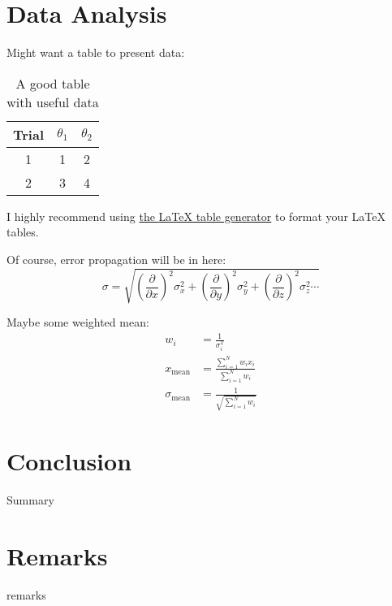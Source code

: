 \documentclass[11pt,oneside,letterpaper]{article} %
\begin{document}
\section{Data Analysis}
Might want a table to present data:


\begin{table}[H] %
\centering
\begin{tabular}{|c|c|c|}
	\hline
	Trial & $\theta_1$ & $\theta_2$  \\ \hline
	1 & 1 & 2 \\ \hline
	2 & 3 & 4 \\ \hline
	\end{tabular}
	\caption{A good table with useful data}
	\label{tbl:data}
\end{table}

I highly recommend using \href{http://www.tablesgenerator.com/latex_tables}{the {\LaTeX} table generator} to format your {\LaTeX} tables.


Of course, error propagation will be in here:
\begin{equation}
    \sigma = \sqrt{\left(\frac{\partial}{\partial x}\right)^2\sigma_x^2+\left(\frac{\partial}{\partial y}\right)^2\sigma_y^2 + \left(\frac{\partial}{\partial z}\right)^2\sigma_z^2\cdots} 
\end{equation}

Maybe some weighted mean:
\begin{align*} %
    w_i &= \frac{1}{\sigma_i^2}\\
    x_{\text{mean}} &= \frac{\sum\limits_{i=1}^N{w_ix_i}}{\sum\limits_{i=1}^N{w_i}}\\
    \sigma_{\text{mean}} &= \frac{1}{\sqrt{\sum\limits_{i=1}^N{w_i}}}
\end{align*}



\section{Conclusion}
Summary



\section{Remarks}
remarks
\end{document}
